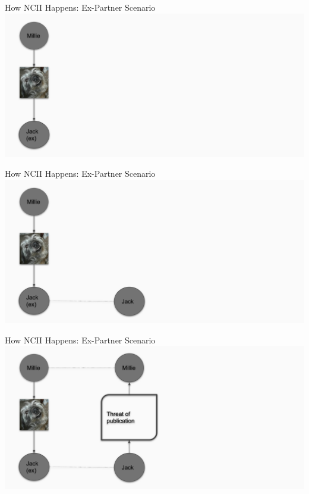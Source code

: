 \documentclass[nobackground,dvipsnames,table,aspectratio=169]{beamer}
\begin{document}
\begin{frame}{How NCII Happens: Ex-Partner Scenario}
    \includegraphics[width=\textwidth]{ex-partner-ncii-diagram-1}
\end{frame}

\begin{frame}{How NCII Happens: Ex-Partner Scenario}
    \includegraphics[width=\textwidth]{ex-partner-ncii-diagram-2}
\end{frame}

\begin{frame}{How NCII Happens: Ex-Partner Scenario}
    \includegraphics[width=\textwidth]{ex-partner-ncii-diagram-3}
\end{frame}
\end{document}
